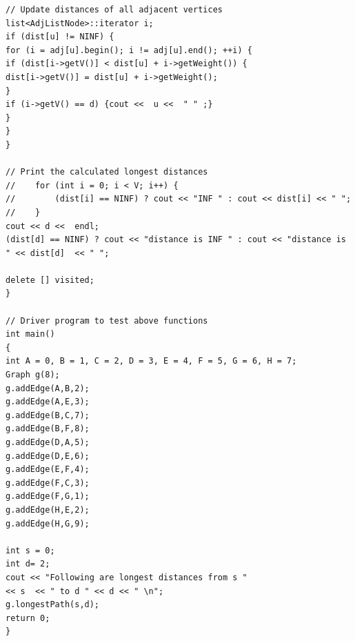 \documentclass[12pt,a4paper]{article}
\theoremstyle{definition}
\begin{document}
\begin{lstlisting}
// Update distances of all adjacent vertices
list<AdjListNode>::iterator i;
if (dist[u] != NINF) {
for (i = adj[u].begin(); i != adj[u].end(); ++i) {
if (dist[i->getV()] < dist[u] + i->getWeight()) {
dist[i->getV()] = dist[u] + i->getWeight();
}
if (i->getV() == d) {cout <<  u <<  " " ;}
}
}
}

// Print the calculated longest distances
//    for (int i = 0; i < V; i++) {
//        (dist[i] == NINF) ? cout << "INF " : cout << dist[i] << " ";
//    }
cout << d <<  endl;
(dist[d] == NINF) ? cout << "distance is INF " : cout << "distance is " << dist[d]  << " ";

delete [] visited;
}

// Driver program to test above functions
int main()
{
int A = 0, B = 1, C = 2, D = 3, E = 4, F = 5, G = 6, H = 7;
Graph g(8);
g.addEdge(A,B,2);
g.addEdge(A,E,3);
g.addEdge(B,C,7);
g.addEdge(B,F,8);
g.addEdge(D,A,5);
g.addEdge(D,E,6);
g.addEdge(E,F,4);
g.addEdge(F,C,3);
g.addEdge(F,G,1);
g.addEdge(H,E,2);
g.addEdge(H,G,9);

int s = 0;
int d= 2;
cout << "Following are longest distances from s "
<< s  << " to d " << d << " \n";
g.longestPath(s,d);
return 0;
}	
\end{lstlisting}


\end{document}
